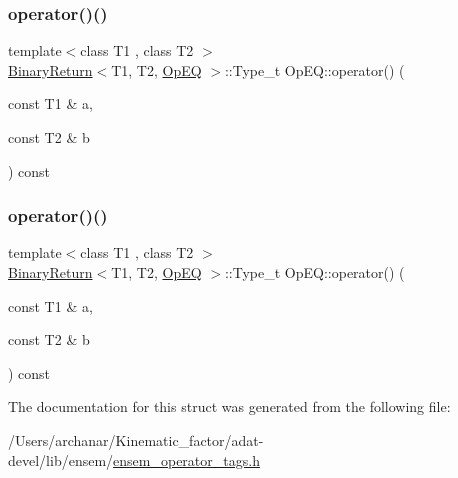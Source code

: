 \mbox{\label{structOpEQ_aadd4c1f0508ded0e1ad084d0a724f912}} 
\subsubsection{\texorpdfstring{operator()()}{operator()()}\hspace{0.1cm}{\footnotesize\ttfamily [2/3]}}
{\footnotesize\ttfamily template$<$class T1 , class T2 $>$ \\
\mbox{\hyperlink{structBinaryReturn}{Binary\+Return}}$<$T1, T2, \mbox{\hyperlink{structOpEQ}{Op\+EQ}} $>$\+::Type\+\_\+t Op\+E\+Q\+::operator() (\begin{DoxyParamCaption}\item[{const T1 \&}]{a,  }\item[{const T2 \&}]{b }\end{DoxyParamCaption}) const\hspace{0.3cm}{\ttfamily [inline]}}

\mbox{\label{structOpEQ_aadd4c1f0508ded0e1ad084d0a724f912}} 
\subsubsection{\texorpdfstring{operator()()}{operator()()}\hspace{0.1cm}{\footnotesize\ttfamily [3/3]}}
{\footnotesize\ttfamily template$<$class T1 , class T2 $>$ \\
\mbox{\hyperlink{structBinaryReturn}{Binary\+Return}}$<$T1, T2, \mbox{\hyperlink{structOpEQ}{Op\+EQ}} $>$\+::Type\+\_\+t Op\+E\+Q\+::operator() (\begin{DoxyParamCaption}\item[{const T1 \&}]{a,  }\item[{const T2 \&}]{b }\end{DoxyParamCaption}) const\hspace{0.3cm}{\ttfamily [inline]}}



The documentation for this struct was generated from the following file\+:\begin{DoxyCompactItemize}
\item 
/\+Users/archanar/\+Kinematic\+\_\+factor/adat-\/devel/lib/ensem/\mbox{\hyperlink{adat-devel_2lib_2ensem_2ensem__operator__tags_8h}{ensem\+\_\+operator\+\_\+tags.\+h}}\end{DoxyCompactItemize}
